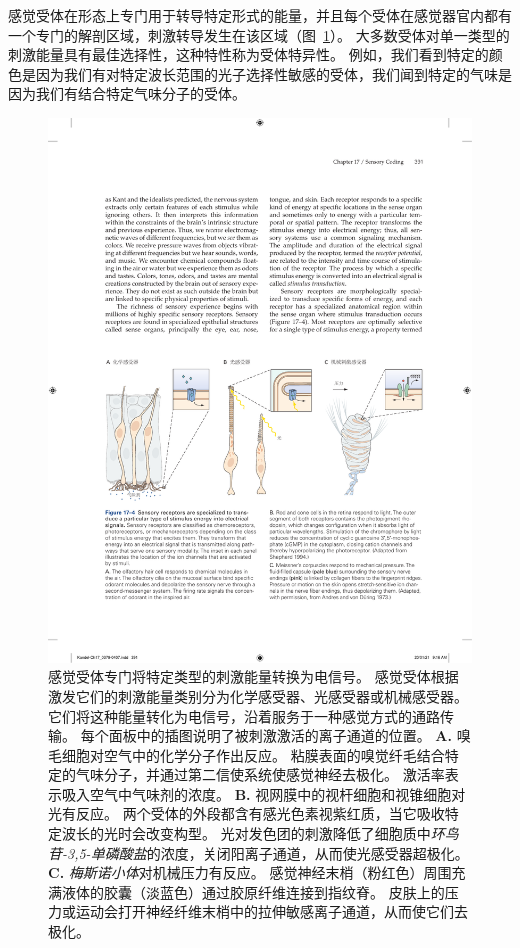 感觉受体在形态上专门用于转导特定形式的能量，并且每个受体在感觉器官内都有一个专门的解剖区域，刺激转导发生在该区域（图~\ref{fig:17_4}）。 
大多数受体对单一类型的刺激能量具有最佳选择性，这种特性称为受体特异性。
例如，我们看到特定的颜色是因为我们有对特定波长范围的光子选择性敏感的受体，我们闻到特定的气味是因为我们有结合特定气味分子的受体。


\begin{figure}[htbp]
	\centering
	\includegraphics[width=1.0\linewidth]{chap17/fig_17_4}
	\caption{感觉受体专门将特定类型的刺激能量转换为电信号。 
		感觉受体根据激发它们的刺激能量类别分为化学感受器、光感受器或机械感受器。
		它们将这种能量转化为电信号，沿着服务于一种感觉方式的通路传输。
		每个面板中的插图说明了被刺激激活的离子通道的位置。
		\textbf{A.} 嗅毛细胞对空气中的化学分子作出反应。
		粘膜表面的嗅觉纤毛结合特定的气味分子，并通过第二信使系统使感觉神经去极化。
		激活率表示吸入空气中气味剂的浓度。
		\textbf{B.} 视网膜中的视杆细胞和视锥细胞对光有反应。
		两个受体的外段都含有感光色素视紫红质，当它吸收特定波长的光时会改变构型。
		光对发色团的刺激降低了细胞质中\textit{环鸟苷-3,5-单磷酸盐}的浓度，关闭阳离子通道，从而使光感受器超极化。
		\textbf{C.} \textit{梅斯诺小体}对机械压力有反应。 
		感觉神经末梢（粉红色）周围充满液体的胶囊（淡蓝色）通过胶原纤维连接到指纹脊。
		皮肤上的压力或运动会打开神经纤维末梢中的拉伸敏感离子通道，从而使它们去极化\cite{albe1973morphology}。}
	\label{fig:17_4}
\end{figure}


